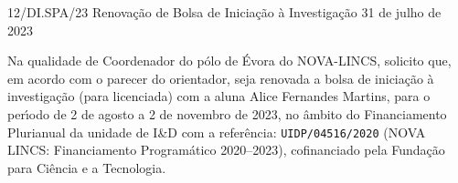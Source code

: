 \documentclass{oficio}
\begin{document}
\unidade{\textsc{\textcolor{gray}{NOVA-LINCS (Pólo de Évora)}}}

\documento
    {12/DI.SPA/23}
    {Renovação de Bolsa de Iniciação à Investigação}
    {31 de julho de 2023}

Na qualidade de Coordenador do pólo de Évora do NOVA-LINCS, solicito que, em acordo com o parecer do orientador, seja renovada a bolsa de iniciação à investigação (para licenciada) com a aluna Alice Fernandes Martins, para o perı́odo de 2 de agosto a 2 de novembro de 2023, no âmbito do Financiamento Plurianual da unidade de I\&D com a referência: \texttt{UIDP/04516/2020} (NOVA LINCS: Financiamento Programático 2020–2023), cofinanciado pela Fundação para Ciência e a Tecnologia.

\end{document}
